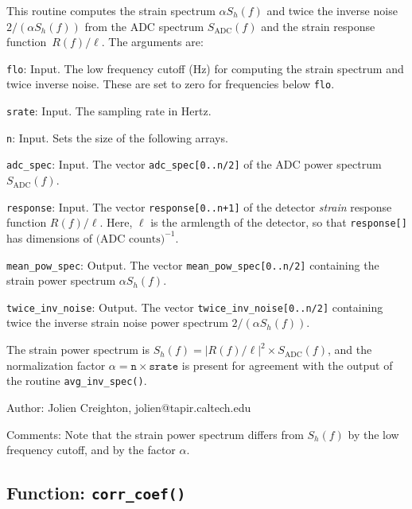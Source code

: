 This routine computes the strain spectrum $\alpha S_h(f)$ and twice the
inverse noise $2/(\alpha S_h(f))$ from the ADC spectrum
$S_{\scriptstyle\mathrm{ADC}}(f)$ and the strain response function~$R(f)/\ell$.
The arguments are:
\begin{description}
\item{\texttt{flo}}: Input.  The low frequency cutoff (Hz) for computing the
  strain spectrum and twice inverse noise.  These are set to zero for
  frequencies below \texttt{flo}.
\item{\texttt{srate}}: Input.  The sampling rate in Hertz.
\item{\texttt{n}}: Input.  Sets the size of the following arrays.
\item{\texttt{adc\_spec}}: Input.  The vector \texttt{adc\_spec[0..n/2]} of
  the ADC power spectrum $S_{\scriptstyle\mathrm{ADC}}(f)$.
\item{\texttt{response}}: Input.  The vector \texttt{response[0..n+1]} of the
  detector \emph{strain} response function $R(f)/\ell$.  Here, $\ell$ is the
  armlength of the detector, so that \texttt{response[]} has dimensions of
  $\mbox{(ADC counts)}^{-1}$.
\item{\texttt{mean\_pow\_spec}}: Output.  The vector
  \texttt{mean\_pow\_spec[0..n/2]} containing the strain power spectrum
  $\alpha S_h(f)$.
\item{\texttt{twice\_inv\_noise}}: Output.  The vector
  \texttt{twice\_inv\_noise[0..n/2]} containing twice the inverse strain noise
  power spectrum $2/(\alpha S_h(f))$.
\end{description}
The strain power spectrum is
$S_h(f)=|R(f)/\ell|^2\times S_{\scriptstyle\mathrm{ADC}}(f)$, and the
normalization factor $\alpha=\texttt{n}\times\texttt{srate}$ is present for
agreement with the output of the routine \texttt{avg\_inv\_spec()}.

\begin{description}
\item{Author:} Jolien Creighton, jolien@tapir.caltech.edu
\item{Comments:} Note that the strain power spectrum differs from $S_h(f)$
  by the low frequency cutoff, and by the factor $\alpha$.
\end{description}


\clearpage
\subsection{Function: \texttt{corr\_coef()}}
\label{ss:corr_coef}

